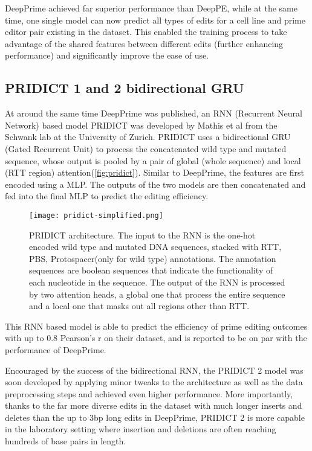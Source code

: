 DeepPrime achieved far superior performance than DeepPE, while at the same time, one single model can now predict all types of edits for a cell line and prime editor pair existing in the dataset. This enabled the training process to take advantage of the shared features between different edits (further enhancing performance) and significantly improve the ease of use.

\subsection{PRIDICT 1 and 2 bidirectional GRU}

At around the same time DeepPrime was published, an RNN (Recurrent Neural Network) based model PRIDICT was developed by Mathis et al from the Schwank lab at the University of Zurich\cite{mathisPredictingPrimeEditing2023}. PRIDICT uses a bidirectional GRU (Gated Recurrent Unit) to process the concatenated wild type and mutated sequence, whose output is pooled by a pair of global (whole sequence) and local (RTT region) attention(\autoref{fig:pridict}). Similar to DeepPrime, the features are first encoded using a MLP. The outputs of the two models are then concatenated and fed into the final MLP to predict the editing efficiency.

\begin{figure}
    \centering
    \texttt{[image: pridict-simplified.png]}
    \caption[PRIDICT architecture]{PRIDICT architecture. The input to the RNN is the one-hot encoded wild type and mutated DNA sequences, stacked with RTT, PBS, Protospacer(only for wild type) annotations. The annotation sequences are boolean sequences that indicate the functionality of each nucleotide in the sequence. The output of the RNN is processed by two attention heads, a global one that process the entire sequence and a local one that masks out all regions other than RTT. }
    \label{fig:pridict}
\end{figure}

This RNN based model is able to predict the efficiency of prime editing outcomes with up to 0.8 Pearson's r on their dataset, and is reported to be on par with the performance of DeepPrime.

Encouraged by the success of the bidirectional RNN, the PRIDICT 2 model was soon developed by applying minor tweaks to the architecture as well as the data preprocessing steps and achieved even higher performance\cite{mathisMachineLearningPrediction2024}. More importantly, thanks to the far more diverse edits in the dataset with much longer inserts and deletes than the up to 3bp long edits in DeepPrime, PRIDICT 2 is more capable in the laboratory setting where insertion and deletions are often reaching hundreds of base pairs in length\cite{liuPrimeEditingPrecise2023}.

